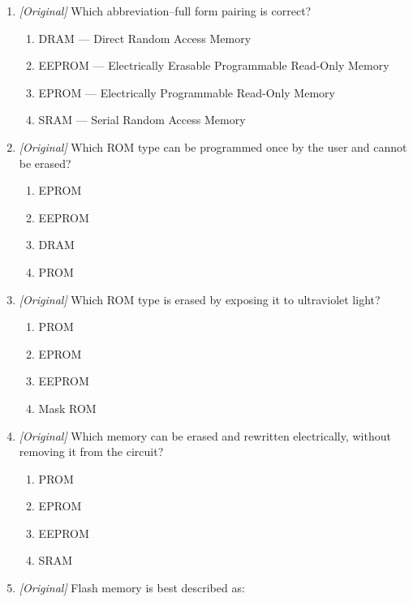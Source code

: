 \documentclass[11pt]{article}
\begin{document}
\begin{enumerate}[label=\textbf{Q\arabic*.}, leftmargin=*]
\begin{enumerate}[label=\Alph*.]
    \item main memory
    \item cache memory
    \item permanent storage of the start-up code
    \item CPU registers
  \end{enumerate}
\item \textit{[Original]} Which abbreviation--full form pairing is correct?
  \begin{enumerate}[label=\Alph*.]
    \item DRAM --- Direct Random Access Memory
    \item EEPROM --- Electrically Erasable Programmable Read-Only Memory
    \item EPROM --- Electrically Programmable Read-Only Memory
    \item SRAM --- Serial Random Access Memory
  \end{enumerate}
\item \textit{[Original]} Which ROM type can be programmed once by the user
  and cannot be erased?
  \begin{enumerate}[label=\Alph*.]
    \item EPROM
    \item EEPROM
    \item DRAM
    \item PROM
  \end{enumerate}
\item \textit{[Original]} Which ROM type is erased by exposing it to
  ultraviolet light?
  \begin{enumerate}[label=\Alph*.]
    \item PROM
    \item EPROM
    \item EEPROM
    \item Mask ROM
  \end{enumerate}
\item \textit{[Original]} Which memory can be erased and rewritten
  electrically, without removing it from the circuit?
  \begin{enumerate}[label=\Alph*.]
    \item PROM
    \item EPROM
    \item EEPROM
    \item SRAM
  \end{enumerate}
\item \textit{[Original]} Flash memory is best described as:
  \begin{enumerate}[label=\Alph*.]

\end{enumerate}
\end{enumerate}
\end{document}
